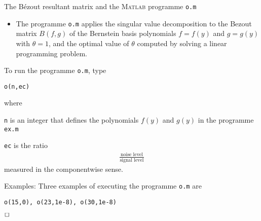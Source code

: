 \documentclass[a4paper,11pt]{article}
\begin{document}
%
\begin{center}
The B\'ezout resultant matrix and the \textsc{Matlab} programme \texttt{o.m}
\end{center}
%
\date{}
%

\hrulefill


\vspace{0.5cm}

\begin{itemize}
\item{
The programme \texttt{o.m}  applies the singular value decomposition
to the Bezout matrix $B(f,g)$
 of the
Bernstein basis polynomials $f=f(y)$ and $g=g(y)$ with $\theta=1$, and
the optimal value of $\theta$ computed by solving a linear programming problem.}
%
\end{itemize}


\vspace{0.5cm}

To run the programme \texttt{o.m}, type
%
\begin{center}
\texttt{o(n,ec)}
\end{center}
%
where
%
\begin{description}
\item{\hspace{0.7cm} \texttt{n} is an integer that defines the polynomials $f(y)$ and $g(y)$ in the programme
\texttt{ex.m}}
%
\item{\hspace{0.7cm} \texttt{ec} is the ratio
%
\begin{eqnarray*}
\frac{\textrm{noise level}}{\textrm{signal level}}
\end{eqnarray*}
%
measured in the componentwise sense.}
\end{description}

\vspace{0.25cm}

Examples: Three examples of executing the programme \texttt{o.m} are
%

\texttt{o(15,0), o(23,1e-8), o(30,1e-8)}

$\hfill\Box$


\vspace{0.25cm}
\end{document}
